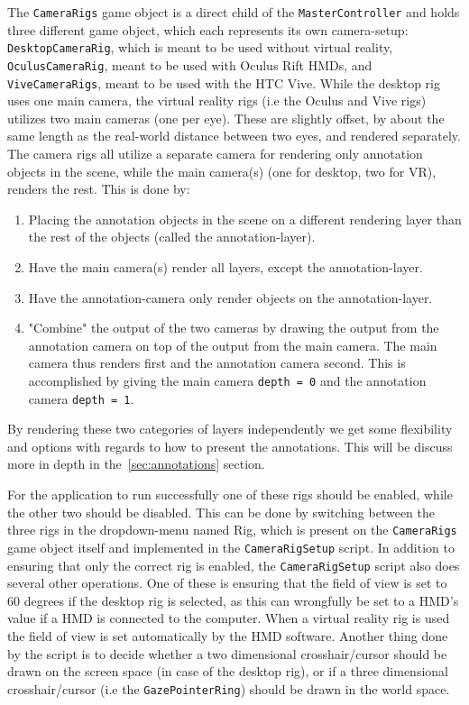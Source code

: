The \texttt{CameraRigs} game object is a direct child of the \texttt{MasterController} and holds three different game object, 
which each represents its own camera-setup: \texttt{DesktopCameraRig}, which is meant to be used
without virtual reality, \texttt{OculusCameraRig}, meant to be used with Oculus Rift HMDs, and \texttt{ViveCameraRigs}, meant to be used with the HTC Vive. 
While the desktop rig uses one main camera, the virtual reality rigs (i.e the Oculus and Vive rigs) utilizes two main cameras (one per eye).
These are slightly offset, by about the same length as the real-world distance between two eyes, and rendered separately.
The camera rigs all utilize a separate camera for rendering only annotation objects in the scene, while the main camera(s) (one for desktop, two for VR), 
renders the rest. %
This is done by:

\begin{enumerate}
	\item Placing the annotation objects in the scene on a different rendering layer than the rest of the objects (called the annotation-layer).
	\item Have the main camera(s) render all layers, except the annotation-layer.
	\item Have the annotation-camera only render objects on the annotation-layer.
	\item "Combine" the output of the two cameras by drawing the output from the annotation camera on top of the output from the main camera. 
		  The main camera thus renders first and the annotation camera second. This is accomplished by giving the main camera \texttt{depth = 0} and the
		  annotation camera \texttt{depth = 1}. 
\end{enumerate}

By rendering these two categories of layers independently we get some flexibility and options with regards to how to present the annotations.
This will be discuss more in depth in the~\vref{sec:annotations} section.

For the application to run successfully one of these rigs should be enabled, while the other two should be disabled.
This can be done by switching between the three rigs in the dropdown-menu named Rig, which is present on the \texttt{CameraRigs} game object itself and
implemented in the \texttt{CameraRigSetup} script. In addition to ensuring that only the correct rig is enabled, 
the \texttt{CameraRigSetup} script also does several other operations. One of these is ensuring that the field of view is set to 60 degrees if the desktop rig 
is selected, as this can wrongfully be set to a HMD's value if a HMD is connected to the computer. When a virtual reality rig is used the field of view is 
set automatically by the HMD software. Another thing done by the script is to decide whether a two dimensional crosshair/cursor should be drawn on the screen space
(in case of the desktop rig), or if a three dimensional crosshair/cursor (i.e the \texttt{GazePointerRing}) should be drawn in the world space. 